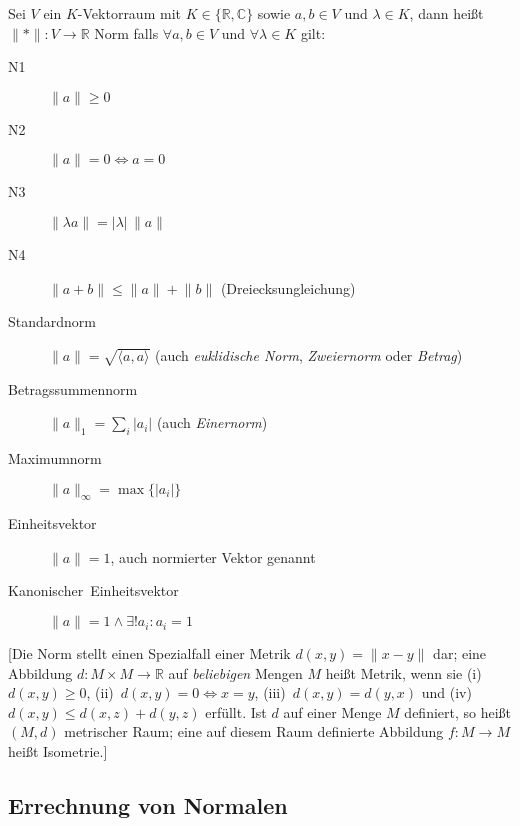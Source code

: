 Sei $V$ ein $K$-Vektorraum mit $K \in \{\mathbb R, \mathbb C\}$ sowie $a,b \in V$ und $\lambda \in K$, dann heißt $\lVert*\rVert : V \to \mathbb R$ Norm falls $\forall a,b \in V$ und $\forall\lambda \in K$ gilt:
\begin{description}
  \item [{N1}]
	$\lVert a\rVert\geq0$
  \item [{N2}]
	$\lVert a\rVert=0 \iff a=0$
  \item [{N3}]
	$\lVert \lambda a \rVert  =  \lvert \lambda \rvert \, \lVert a \rVert$
  \item [{N4}]
	$\lVert a+b\rVert\leq\lVert a\rVert+\lVert b\rVert$ (Dreiecksungleichung)
  \item [{Standardnorm}] 
	$\lVert a\rVert=\sqrt{\langle a,a\rangle }$ (auch \emph{euklidische Norm}, \emph{Zweiernorm} oder \emph{Betrag})
  \item [{Betragssummennorm}] 
	$\lVert a\rVert_1=\sum_{i}\lvert a_i \rvert$ (auch \emph{Einernorm})
  \item [{Maximumnorm}] 
	$\lVert a\rVert_{\infty} = \max\bigl\{\lvert a_i \rvert \bigr\}$
  \item [{Einheitsvektor}] 
	$\lVert a\rVert=1$, auch normierter Vektor genannt
  \item [{Kanonischer~Einheitsvektor}] 
	$\lVert a\rVert=1\land\exists! a_i : a_i=1$
\end{description}
\label{metrischer-raum}
[Die Norm stellt einen Spezialfall einer Metrik $d(x,y)=\lVert x-y \rVert$ dar; eine Abbildung $d : M \times M \to \mathbb R$ auf \emph{beliebigen} Mengen $M$ heißt Metrik, wenn sie (i)~$d(x,y)\geq0$, (ii)~$d(x,y)=0 \iff x=y$, (iii)~$d(x,y)=d(y,x)$ und (iv)~$d(x,y) \leq d(x,z)+d(y,z)$ erfüllt.
Ist $d$ auf einer Menge $M$ definiert, so heißt $(M,d)$ metrischer Raum; eine auf diesem Raum definierte Abbildung $f : M \to M$ heißt Isometrie.]

\subsection{\label{sub:Errechnung-von-Normalen}Errechnung von Normalen}

